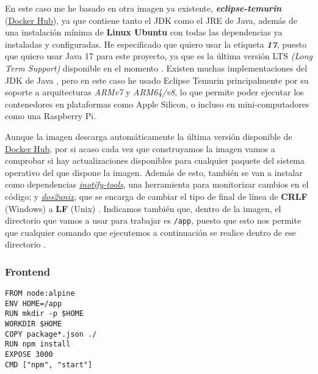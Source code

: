 En este caso me he basado en otra imagen ya existente, \textit{\textbf{eclipse-temurin}} (\href{https://hub.docker.com/layers/library/eclipse-temurin/17/images/sha256-b0faf02bf7acfc65be1c2d0a291140300bd129620f145bf1013a1da748295d0c?context=explore}{Docker Hub}), ya que contiene tanto el JDK como el JRE de Java, además de una instalación mínima de \textbf{Linux Ubuntu} con todas las dependencias ya instaladas y configuradas. He especificado que quiero usar la etiqueta \textit{\textbf{17}}, puesto que quiero usar Java 17 para este proyecto, ya que es la última versión LTS \textit{(Long Term Support)} disponible en el momento \cite{java:releases}. Existen muchas implementaciones del JDK de Java \cite{foojay:java-jdks}, pero en este caso he usado Eclipse Temurin principalmente por su soporte a arquitecturas \textit{ARMv7} y \textit{ARM64/v8}, lo que permite poder ejecutar los contenedores en plataformas como Apple Silicon, o incluso en mini-computadores como una Raspberry Pi.

Aunque la imagen descarga automáticamente la última versión disponible de \href{https://hub.docker.com/layers/library/eclipse-temurin/17/images/sha256-b0faf02bf7acfc65be1c2d0a291140300bd129620f145bf1013a1da748295d0c?context=explore}{Docker Hub}, por si acaso cada vez que construyamos la imagen vamos a comprobar si hay actualizaciones disponibles para cualquier paquete del sistema operativo del que dispone la imagen. Además de esto, también se van a instalar como dependencias \textit{\href{https://github.com/inotify-tools}{inotify-tools}}, una herramienta para monitorizar cambios en el código; y \textit{\href{https://dos2unix.sourceforge.io/}{dos2unix}}, que se encarga de cambiar el tipo de final de línea de \textbf{CRLF} (Windows) a \textbf{LF} (Unix) \cite{medium:spring-boot-in-docker}. Indicamos también que, dentro de la imagen, el directorio que vamos a usar para trabajar es \verb,/app,, puesto que esto nos permite que cualquier comando que ejecutemos a continuación se realice dentro de ese directorio \cite{docker:workdir}.

\subsubsection{Frontend} \label{dockerfile-frontend}

\begin{lstlisting}
FROM node:alpine
ENV HOME=/app
RUN mkdir -p $HOME
WORKDIR $HOME
COPY package*.json ./
RUN npm install
EXPOSE 3000
CMD ["npm", "start"]
\end{lstlisting}

